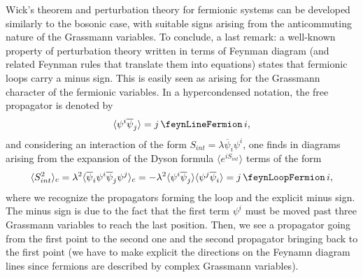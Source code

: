 Wick's theorem and perturbation theory for fermionic systems can be developed similarly to the bosonic case, with suitable signs arising from the anticommuting nature of the Grassmann variables. To conclude, a last remark: a well-known property of perturbation theory written in terms of Feynman diagram (and related Feynman rules that translate them into equations) states that fermionic loops carry a minus sign. This is easily seen as arising for the Grassmann character of the fermionic variables. In a hypercondensed notation, the free propagator is denoted by
\[
    \langle \psi^i \overline{\psi}_j \rangle = j\, \feynLineFermion\, i,
\]
and considering an interaction of the form \(S_{int} = \lambda \overline{\psi}_i \psi^i\), one finds in diagrams arising from the expansion of the Dyson formula \(\langle e^{i S_{int}} \rangle\)  terms of the form
\[
    \langle S_{int}^2 \rangle_c = \lambda^2 \langle \overline{\psi}_i \psi^i \overline{\psi}_j \psi^j \rangle_c = - \lambda^2 \langle \psi^i \overline{\psi}_j \rangle \langle \psi^j \overline{\psi}_i \rangle = j \, \feynLoopFermion \, i,
\]
where we recognize the propagators forming the loop and the explicit minus sign. The minus sign is due to the fact that the first term \(\psi^i\) must be moved past three Grassmann variables to reach the last position. Then, we see a propagator going from the first point to the second one and the second propagator bringing back to the first point (we have to make explicit the directions on the Feynamn diagram lines since fermions are described by complex Grassmann variables).